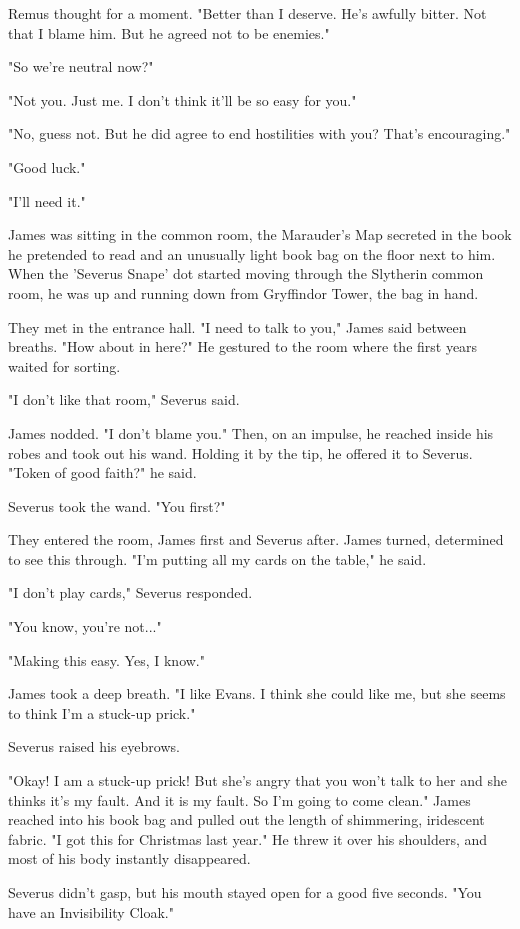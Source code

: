 \documentclass[a4paper,11pt]{article}
\begin{document}
Remus thought for a moment. "Better than I deserve. He's awfully bitter. Not that I blame him. But he agreed not to be enemies."

"So we're neutral now?"

"Not you. Just me. I don't think it'll be so easy for you."

"No, guess not. But he did agree to end hostilities with you? That's encouraging."

"Good luck."

"I'll need it."

James was sitting in the common room, the Marauder's Map secreted in the book he pretended to read and an unusually light book bag on the floor next to him. When the 'Severus Snape' dot started moving through the Slytherin common room, he was up and running down from Gryffindor Tower, the bag in hand.

They met in the entrance hall. "I need to talk to you," James said between breaths. "How about in here?" He gestured to the room where the first years waited for sorting.

"I don't like that room," Severus said.

James nodded. "I don't blame you." Then, on an impulse, he reached inside his robes and took out his wand. Holding it by the tip, he offered it to Severus. "Token of good faith?" he said.

Severus took the wand. "You first?"

They entered the room, James first and Severus after. James turned, determined to see this through. "I'm putting all my cards on the table," he said.

"I don't play cards," Severus responded.

"You know, you're not..."

"Making this easy. Yes, I know."

James took a deep breath. "I like Evans. I think she could like me, but she seems to think I'm a stuck-up prick."

Severus raised his eyebrows.

"Okay! I am a stuck-up prick! But she's angry that you won't talk to her and she thinks it's my fault. And it is my fault. So I'm going to come clean." James reached into his book bag and pulled out the length of shimmering, iridescent fabric. "I got this for Christmas last year." He threw it over his shoulders, and most of his body instantly disappeared.

Severus didn't gasp, but his mouth stayed open for a good five seconds. "You have an Invisibility Cloak."
\end{document}
